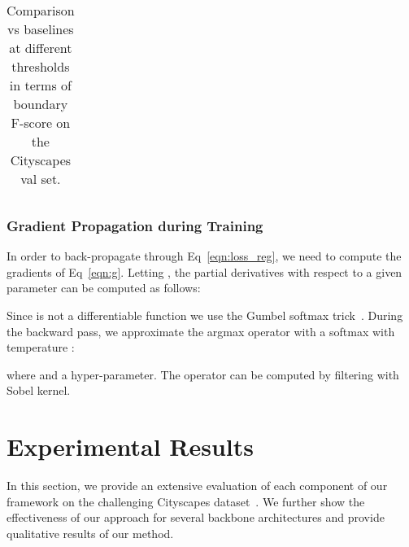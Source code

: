 \documentclass[10pt,twocolumn,letterpaper]{article}
\begin{document}
\begin{table*}[t!]
{\begin{tabular}{c|l| c|c|c|c|c|c|c|c|c|c|c|c|c|c|c|c|c|c|c|c}
\end{tabular}
}
\vspace{-3mm}
\caption{ Comparison vs baselines at different thresholds in terms of boundary F-score  on the 
 Cityscapes val set. \label{cityscapes_sota_val_set_fscore}}
 \vspace{-2mm}
\end{table*}


\vspace{-2mm}
\subsubsection{Gradient Propagation during Training}
In order to back-propagate through Eq~\ref{eqn:loss_reg}, we need to compute the gradients of Eq~\ref{eqn:g}. Letting , the partial derivatives with respect to a given parameter  can be  computed as follows:

Since  is not a differentiable function we use the Gumbel softmax trick~\cite{jang2016categorical}. 
During the backward pass, we approximate the argmax operator with a softmax with temperature :

where  and  a hyper-parameter. 
The operator  can be computed by filtering with Sobel kernel.
 
\vspace{-1mm}

\section{Experimental Results}

In this section, we provide an extensive evaluation of
each component of our framework on the challenging Cityscapes dataset~\cite{cityscapes}.
We further show the effectiveness of our approach for several backbone architectures and provide 
qualitative results of our method.

\iffalse
\begin{figure}[t!]
\vspace{-2mm}
\centering
\texttt{[image: images/crop.pdf]}
\vspace{-6mm}
\caption{Comparison of mIoU at different crop factors.}
\label{fig:crop}
\end{figure}
\fi

 \vspace{-3mm}
\end{document}
